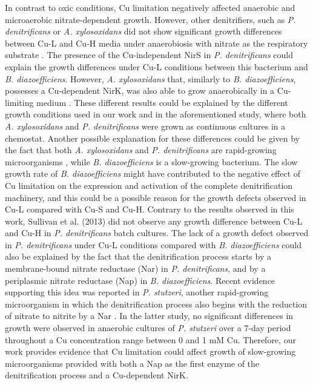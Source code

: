 \documentclass[a4paper,11pt]{article}
\begin{document}
In contrast to oxic conditions, Cu limitation negatively affected anaerobic and microaerobic
nitrate-dependent growth. However, other denitrifiers, such as {\em P. denitrificans}
or {\em A. xylosoxidans} did not show significant growth differences between Cu-L and Cu-H
media under anaerobiosis with nitrate as the respiratory substrate \cite{felgate2012impact}. The presence of
the Cu-independent NirS in {\em P. denitrificans} could explain the growth differences under
Cu-L conditions between this bacterium and {\em B. diazoefficiens}. However, {\em A. xylosoxidans}
that, similarly to {\em B. diazoefficiens}, possesses a Cu-dependent NirK, was also able to grow
anaerobically in a Cu-limiting medium \cite{felgate2012impact}. These different results could be explained
by the different growth conditions used in our work and in the aforementioned study,
where both {\em A. xylosoxidans} and {\em P. denitrificans} were grown as continuous cultures in a
chemostat. Another possible explanation for these differences could be given by the fact
that both {\em A. xylosoxidans} and {\em P. denitrificans} are rapid-growing microorganisms \cite{felgate2012impact}, while
{\em B. diazoefficiens} is a slow-growing bacterium. The slow growth rate of {\em B. diazoefficiens} might
have contributed to the negative effect of Cu limitation on the expression and activation of
the complete denitrification machinery, and this could be a possible reason for the growth
defects observed in Cu-L compared with Cu-S and Cu-H. Contrary to the results observed
in this work, Sullivan et al. (2013) \cite{sullivan2013copper} did not observe any growth difference between
Cu-L and Cu-H in {\em P. denitrificans} batch cultures. The lack of a growth defect observed
in {\em P. denitrificans} under Cu-L conditions \cite{sullivan2013copper} compared with {\em B. diazoefficiens} could also
be explained by the fact that the denitrification process starts by a membrane-bound nitrate
reductase (Nar) in {\em P. denitrificans}, and by a periplasmic nitrate reductase (Nap) in
{\em B. diazoefficiens}. Recent evidence supporting this idea was reported in {\em P. stutzeri}, another
rapid-growing microorganism in which the denitrification process also begins with the
reduction of nitrate to nitrite by a Nar \cite{black2016influence}. In the latter study, no significant differences in
growth were observed in anaerobic cultures of {\em P. stutzeri} over a 7-day period throughout a
Cu concentration range between 0 and 1 mM Cu. Therefore, our work provides evidence
that Cu limitation could affect growth of slow-growing microorganisms provided with
both a Nap as the first enzyme of the denitrification process and a Cu-dependent NirK.
\end{document}
